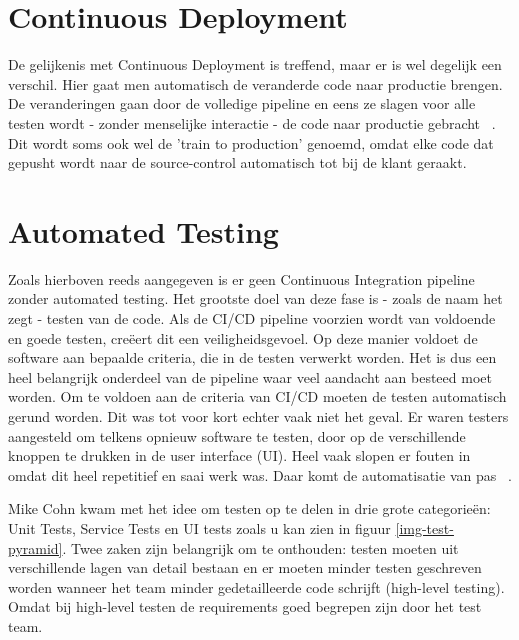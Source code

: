         \section{Continuous Deployment}
        De gelijkenis met Continuous Deployment is treffend, maar er is wel degelijk een verschil.
        Hier gaat men automatisch de veranderde code naar productie brengen. De veranderingen gaan door de volledige pipeline en eens ze slagen voor alle testen wordt - zonder menselijke interactie - de code naar productie gebracht ~\autocite{Claps2015}.
        Dit wordt soms ook wel de 'train to production' genoemd, omdat elke code dat gepusht wordt naar de source-control automatisch tot bij de klant geraakt.
        
        \section{Automated Testing}
        Zoals hierboven reeds aangegeven is er geen Continuous Integration pipeline zonder automated testing. Het grootste doel van deze fase is - zoals de naam het zegt - testen van de code. Als de CI/CD pipeline voorzien wordt van voldoende en goede testen, creëert dit een veiligheidsgevoel. Op deze manier voldoet de software aan bepaalde criteria, die in de testen verwerkt worden. Het is dus een heel belangrijk onderdeel van de pipeline waar veel aandacht aan besteed moet worden. 
        Om te voldoen aan de criteria van CI/CD moeten de testen automatisch gerund worden. Dit was tot voor kort echter vaak niet het geval. Er waren testers aangesteld om telkens opnieuw software te testen, door op de verschillende knoppen te drukken in de user interface (UI). Heel vaak slopen er fouten in omdat dit heel repetitief en saai werk was. Daar komt de automatisatie van pas ~\autocite{Vocke2018}.
        
        Mike Cohn kwam met het idee om testen op te delen in drie grote categorieën: Unit Tests, Service Tests en UI tests zoals u kan zien in figuur \ref{img-test-pyramid}.
        Twee zaken zijn belangrijk om te onthouden: testen moeten uit verschillende lagen van detail bestaan en er moeten minder testen geschreven worden wanneer het team minder gedetailleerde code schrijft (high-level testing). Omdat bij high-level testen de requirements goed begrepen zijn door het test team.
        
